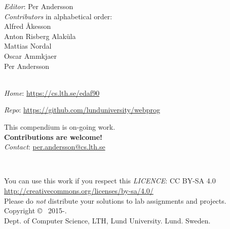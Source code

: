 
\clearpage\null\thispagestyle{empty}
\vfill

{
\setlength{\parindent}{0pt}
\emph{Editor}: Per Andersson \\

%
\emph{Contributors} in alphabetical order: \\
Alfred Åkesson\\
Anton Risberg Alaküla\\
Mattias Nordal\\
Oscar Ammkjaer\\
Per Andersson \\
\\ \newline

\emph{Home}: \url{https://cs.lth.se/edaf90} \newline

\emph{Repo}: \url{https://github.com/lunduniversity/webprog} \\ \newline

This compendium is on-going work. \\ \textbf{Contributions are welcome!} \\
\emph{Contact}: \url{per.andersson@cs.lth.se}
\\ \newline

~\\ \newline

You can use this work if you respect this \emph{LICENCE}: CC BY-SA 4.0 \\
\url{http://creativecommons.org/licenses/by-sa/4.0/} \\
Please do \emph{not} distribute your solutions to lab assignments and projects.
\\ \newline
Copyright \copyright~ 2015-\the\year. \\
Dept. of Computer Science, LTH, Lund University. Lund. Sweden.\\
}